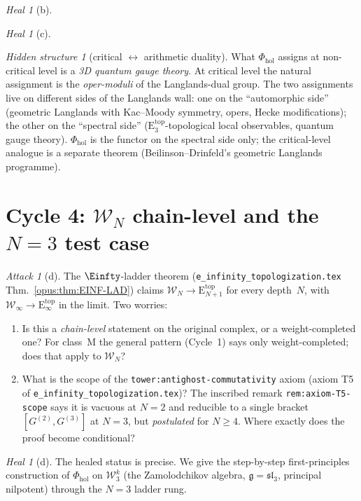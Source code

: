 \documentclass{article}
\theoremstyle{definition}
\theoremstyle{remark}
\newtheorem{attack}[theorem]{Attack}
\newtheorem{heal}[theorem]{Heal}
\newtheorem{hidden}[theorem]{Hidden structure}
\newcommand{\Phihol}{\Phi_{\mathrm{hol}}}
\newcommand{\Etop}[1]{\mathrm{E}_{#1}^{\mathrm{top}}}
\newcommand{\fg}{\mathfrak{g}}
\newcommand{\cW}{\mathcal{W}}
\begin{document}
\begin{heal}[b]
\begin{heal}[c]
\begin{hidden}[critical $\leftrightarrow$ arithmetic duality]
\label{hidden:cycle3}
What $\Phihol$ assigns at non-critical level is a
\emph{3D quantum gauge theory}. At critical level the natural
assignment is the \emph{oper-moduli} of the Langlands-dual
group. The two assignments live on different sides of the
Langlands wall: one on the ``automorphic side'' (geometric
Langlands with Kac--Moody symmetry, opers, Hecke modifications);
the other on the ``spectral side''
($\Etop{3}$-topological local observables, quantum gauge
theory). $\Phihol$ is the functor on the spectral side only;
the critical-level analogue is a separate theorem
(Beilinson--Drinfeld's geometric Langlands programme).
\end{hidden}
\end{heal}

\section{Cycle 4: $\cW_N$ chain-level and the $N=3$ test case}
\label{sec:opus-cycle-4}

\begin{attack}[d]
\label{att:cycle4}
The $\Einfty$-ladder theorem
(\texttt{e\_infinity\_topologization.tex}
Thm.~\ref*{opus:thm:EINF-LAD}) claims
$\cW_N \to \Etop{N+1}$
for every depth~$N$, with $\cW_\infty \to \Etop{\infty}$ in
the limit. Two worries:
\begin{enumerate}[label=\textup{(\roman*)}]
\item Is this a \emph{chain-level} statement on the original
complex, or a weight-completed one? For class~M the
general pattern (Cycle~1) says only weight-completed;
does that apply to $\cW_N$?
\item What is the scope of the
\texttt{tower:antighost-commutativity} axiom (axiom T5 of
\texttt{e\_infinity\_topologization.tex})? The inscribed
remark \texttt{rem:axiom-T5-scope} says it is vacuous at
$N=2$ and reducible to a single bracket
$[G^{(2)}, G^{(3)}]$ at $N=3$, but \emph{postulated} for
$N \ge 4$. Where exactly does the proof become conditional?
\end{enumerate}
\end{attack}

\begin{heal}[d]
\label{heal:cycle4}
The healed status is precise. We give the step-by-step
first-principles construction of $\Phihol$ on
$\cW_3^k$ (the Zamolodchikov algebra, $\fg = \mathfrak{sl}_3$,
principal nilpotent) through the $N=3$ ladder rung.


\end{heal}
\end{heal}
\end{document}
